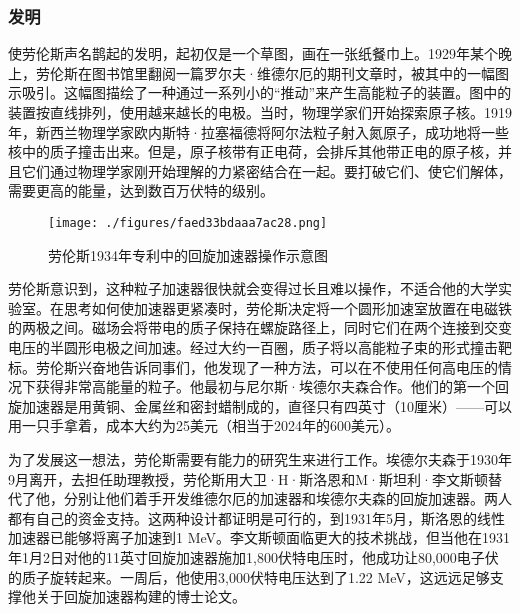 \subsubsection{发明}
使劳伦斯声名鹊起的发明，起初仅是一个草图，画在一张纸餐巾上。1929年某个晚上，劳伦斯在图书馆里翻阅一篇罗尔夫·维德尔厄的期刊文章时，被其中的一幅图示吸引。这幅图描绘了一种通过一系列小的“推动”来产生高能粒子的装置。图中的装置按直线排列，使用越来越长的电极。当时，物理学家们开始探索原子核。1919年，新西兰物理学家欧内斯特·拉塞福德将阿尔法粒子射入氮原子，成功地将一些核中的质子撞击出来。但是，原子核带有正电荷，会排斥其他带正电的原子核，并且它们通过物理学家刚开始理解的力紧密结合在一起。要打破它们、使它们解体，需要更高的能量，达到数百万伏特的级别。
\begin{figure}[ht]
\centering
\texttt{[image: ./figures/faed33bdaaa7ac28.png]}
\caption{劳伦斯1934年专利中的回旋加速器操作示意图} \label{fig_ONST_1}
\end{figure}
劳伦斯意识到，这种粒子加速器很快就会变得过长且难以操作，不适合他的大学实验室。在思考如何使加速器更紧凑时，劳伦斯决定将一个圆形加速室放置在电磁铁的两极之间。磁场会将带电的质子保持在螺旋路径上，同时它们在两个连接到交变电压的半圆形电极之间加速。经过大约一百圈，质子将以高能粒子束的形式撞击靶标。劳伦斯兴奋地告诉同事们，他发现了一种方法，可以在不使用任何高电压的情况下获得非常高能量的粒子。他最初与尼尔斯·埃德尔夫森合作。他们的第一个回旋加速器是用黄铜、金属丝和密封蜡制成的，直径只有四英寸（10厘米）——可以用一只手拿着，成本大约为25美元（相当于2024年的600美元）。

为了发展这一想法，劳伦斯需要有能力的研究生来进行工作。埃德尔夫森于1930年9月离开，去担任助理教授，劳伦斯用大卫·H·斯洛恩和M·斯坦利·李文斯顿替代了他，分别让他们着手开发维德尔厄的加速器和埃德尔夫森的回旋加速器。两人都有自己的资金支持。这两种设计都证明是可行的，到1931年5月，斯洛恩的线性加速器已能够将离子加速到1 MeV。李文斯顿面临更大的技术挑战，但当他在1931年1月2日对他的11英寸回旋加速器施加1,800伏特电压时，他成功让80,000电子伏的质子旋转起来。一周后，他使用3,000伏特电压达到了1.22 MeV，这远远足够支撑他关于回旋加速器构建的博士论文。
